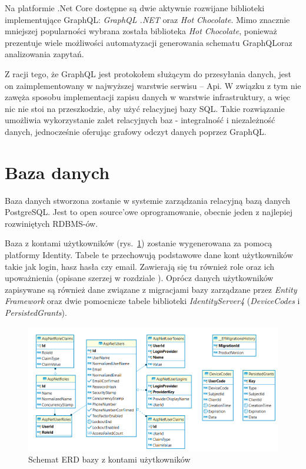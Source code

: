 	Na platformie \@.Net Core dostępne są dwie aktywnie rozwijane biblioteki implementujące GraphQL\@: \emph{GraphQL \@.NET} oraz \emph{Hot Chocolate}.
	Mimo znacznie mniejszej popularności wybrana została biblioteka \emph{Hot Chocolate},
	ponieważ prezentuje wiele możliwości automatyzacji generowania schematu GraphQL\@ oraz analizowania zapytań.

	Z racji tego, że GraphQL jest protokołem służącym do przesyłania danych, jest on zaimplementowany w najwyższej warstwie serwisu -- Api.
	W związku z tym nie zawęża sposobu implementacji zapisu danych w warstwie infrastruktury,
	a więc nic nie stoi na przeszkodzie, aby użyć relacyjnej bazy SQL.
	Takie rozwiązanie umożliwia wykorzystanie zalet relacyjnych baz - integralność i niezależność danych,
	jednocześnie oferując grafowy odczyt danych poprzez GraphQL.

\section{Baza danych}
	Baza danych stworzona zostanie w systemie zarządzania relacyjną bazą danych PostgreSQL.
	Jest to open source'owe oprogramowanie, obecnie jeden z najlepiej rozwiniętych RDBMS-ów.

	Baza z kontami użytkowników (rys.~\ref{fig:erdAuth}) zostanie wygenerowana za pomocą platformy Identity.
	Tabele te przechowują podstawowe dane kont użytkowników takie jak login, hasz hasła czy email.
	Zawierają się tu również role oraz ich upoważnienia (opisane szerzej w rozdziale ).
	Oprócz danych użytkowników zapisywane są również dane związane z migracjami bazy zarządzane przez \emph{Entity Framework}
	oraz dwie pomocnicze tabele biblioteki \emph{IdentityServer4} (\emph{DeviceCodes} i \emph{PersistedGrants}).

	\begin{figure}[ht]
		\centering
			\includegraphics[width=\linewidth]{rys03/erdAuth.png}
		 \caption{Schemat ERD bazy z kontami użytkowników}
		 \label{fig:erdAuth}
	\end{figure}
	
